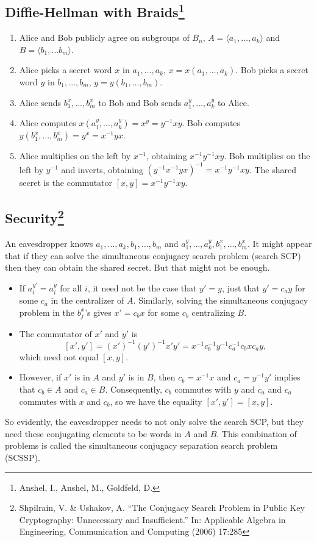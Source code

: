 \documentclass[11pt]{article}
\begin{document}
\subsection*{Diffie-Hellman with Braids\footnote{Anshel, I., Anshel, M., Goldfeld, D.}}
\begin{enumerate}
	\item Alice and Bob publicly agree on subgroups of $B_n$,  $A = \langle a_1, \ldots, a_k\rangle$ and $B = \langle b_1, \ldots b_m\rangle$.
	\item Alice picks a secret word $x$ in $a_1, \ldots, a_k$, $x = x(a_1, \ldots, a_k)$. Bob picks a secret word $y$ in $b_1, \ldots, b_m$, $y = y(b_1, \ldots, b_m)$.
	\item Alice sends $b_1^x, \ldots, b_m^x$ to Bob and Bob sends $a_1^y, \ldots, a_k^y$ to Alice.
	\item Alice computes $x(a_1^y, \ldots, a_k^y) = x^y = y^{-1}xy$. Bob computes $y(b_1^x, \ldots, b_m^x) = y^x = x^{-1}yx$.
	\item Alice multiplies on the left by $x^{-1}$, obtaining $x^{-1}y^{-1}xy$. Bob multiplies on the left by $y^{-1}$ and inverts, obtaining $(y^{-1}x^{-1}yx)^{-1} = x^{-1}y^{-1}xy$. The shared secret is the commutator $[x,y] = x^{-1}y^{-1}xy$.
\end{enumerate}

\subsection*{Security\footnote{Shpilrain, V. \& Ushakov, A. ``The Conjugacy Search Problem in Public Key Cryptography: Unnecessary and Insufficient.'' In: Applicable Algebra in Engineering, Communication and Computing (2006) 17:285}}
An eavesdropper knows $a_1, \ldots, a_k, b_1, \ldots, b_m$ and $a_1^y, \ldots, a_k^y, b_1^x, \ldots, b_m^x$. It might appear that if they can solve the simultaneous conjugacy search problem (search SCP) then they can obtain the shared secret. But that might not be enough.
\begin{itemize}
	\item If $a_i^{y'} = a_i^y$ for all $i$, it need not be the case that $y' = y$, just that $y' = c_ay$ for some $c_a$ in the centralizer of $A$. Similarly, solving the simultaneous conjugacy problem in the $b_j^x$'s gives $x' = c_bx$ for some $c_b$ centralizing $B$.
	\item The commutator of $x'$ and $y'$ is
	\[
	[x',y'] = (x')^{-1}(y')^{-1}x'y' = x^{-1}c_b^{-1}y^{-1}c_a^{-1}c_bxc_ay,
	\]
	which need not equal $[x,y]$.
	\item However, if $x'$ is in $A$ and $y'$ is in $B$, then $c_b = x^{-1}x$ and $c_a = y^{-1}y'$ implies that $c_b \in A$ and $c_a\in B$. Consequently, $c_b$ commutes with $y$ and $c_a$ and $c_a$ commutes with $x$ and $c_b$, so we have the equality $[x',y'] = [x,y]$.
\end{itemize}
So evidently, the eavesdropper needs to not only solve the search SCP, but they need these conjugating elements to be words in $A$ and $B$. This combination of problems is called the simultaneous conjugacy separation search problem (SCSSP). 
\end{document}
